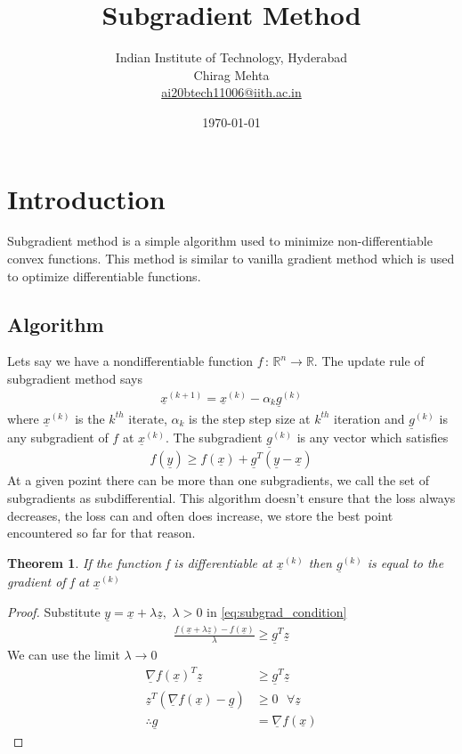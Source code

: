 \documentclass[twoside,twocolumn]{article}
\title{Subgradient Method} %
\author{%
\normalsize Indian Institute of Technology, Hyderabad \\ %
\normalsize Chirag Mehta \\ %
\normalsize \href{mailto:ai20btech11006@iith.ac.in}{ai20btech11006@iith.ac.in} %
}
\date{\today} %
\newtheorem{theorem}{Theorem}[section]
\renewcommand{\vec}[1]{\underline{#1}}
\newcommand\twospace{\,\,}
\newcommand\fourspace{\,\,\,\,}
\begin{document}
\maketitle

\section{Introduction}
Subgradient method is a simple algorithm used to minimize non-differentiable convex functions. This method is similar to vanilla gradient method which is used to optimize differentiable functions.~\cite{boyd2003subgradient}

\subsection{Algorithm}\label{sub:algorithm}
Lets say we have a nondifferentiable function $f\, : \, \mathbb{R}^n\to \mathbb{R}$. The update rule of subgradient method says
\begin{align}
    \vec{x}^{(k+1)} = \vec{x}^{(k)} - \alpha_k\vec{g}^{(k)} \label{eq:subgrad_iter}
\end{align}
where $\vec{x}^{(k)}$ is the $k^{th}$ iterate, $\alpha_k$ is the step step size at $k^{th}$ iteration and $\vec{g}^{(k)}$ is any subgradient of $f$ at $\vec{x}^{(k)}$. The subgradient $\vec{g}^{(k)}$ is any vector which satisfies
\begin{align}
    f(\vec{y}) \geq f(\vec{x}) + \vec{g}^T(\vec{y}-\vec{x})\label{eq:subgrad_condition}
\end{align}
At a given pozint there can be more than one subgradients, we call the set of subgradients as subdifferential. This algorithm doesn't ensure that the loss always decreases, the loss can and often does increase, we store the best point encountered so far for that reason.
\begin{theorem}
    If the function f is differentiable at $\vec{x}^{(k)}$ then $\vec{g}^{(k)}$ is equal to the gradient of f at $\vec{x}^{(k)}$
\end{theorem}
\begin{proof}
    Substitute $\vec{y} = \vec{x}+\lambda\vec{z},\twospace \lambda > 0$ in \eqref{eq:subgrad_condition}
    \begin{align}
        \frac{f(\vec{x}+\lambda\vec{z}) - f(\vec{x})}{\lambda} \geq \vec{g}^T\vec{z}
    \end{align}
    We can use the limit $\lambda \to 0$
    \begin{align}
        \vec{\nabla}f(\vec{x})^T\vec{z} &\geq \vec{g}^T\vec{z}\\
        \vec{z}^T\left(\vec{\nabla}f(\vec{x})-\vec{g}\right) &\geq 0 \fourspace \forall \vec{z}\\
        \therefore \vec{g} & = \vec{\nabla}f(\vec{x})
    \end{align}
\end{proof}
\end{document}
